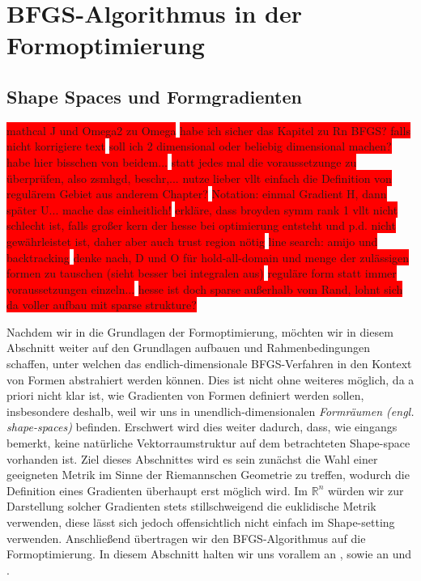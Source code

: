 
\section{BFGS-Algorithmus in der Formoptimierung}
\subsection{Shape Spaces und Formgradienten}
\label{Chap_shapespaces}

\colorbox{red}{mathcal J und Omega2 zu Omega} \newline
\colorbox{red}{habe ich sicher das Kapitel zu Rn BFGS? falls nicht korrigiere text}  \newline
\colorbox{red}{soll ich 2 dimensional oder beliebig dimensional machen? habe hier bisschen von beidem...} \newline
\colorbox{red}{ statt jedes mal die voraussetzunge zu überprüfen, also zsmhgd, beschr,... nutze lieber vllt einfach die Definition von regulärem Gebiet aus anderem Chapter?} \newline
\colorbox{red}{Notation: einmal Gradient H, dann später U... mache das einheitlich!} \newline
\colorbox{red}{erkläre, dass broyden symm rank 1 vllt nicht schlecht ist, falls großer kern der hesse bei optimierung entsteht und p.d. nicht gewährleistet ist,
daher aber auch trust region nötig} \newline
\colorbox{red}{line search: amijo und backtracking} \newline
\colorbox{red}{denke nach, D und O für hold-all-domain und menge der zulässigen formen zu tauschen (sieht besser bei integralen aus)} \newline
\colorbox{red}{reguläre form statt immer voraussetzungen einzeln...} \newline
\colorbox{red}{hesse ist doch sparse außerhalb vom Rand, lohnt sich da voller aufbau mit sparse strukture?}

Nachdem wir in die Grundlagen der Formoptimierung, möchten wir in diesem Abschnitt weiter auf den Grundlagen aufbauen und Rahmenbedingungen schaffen, unter welchen das endlich-dimensionale BFGS-Verfahren in den Kontext von Formen abstrahiert werden können. Dies ist nicht ohne weiteres möglich, da a priori nicht klar ist, wie Gradienten von Formen definiert werden sollen, insbesondere deshalb, weil wir uns in unendlich-dimensionalen \textit{Formräumen (engl. shape-spaces)} befinden. Erschwert wird dies weiter dadurch, dass, wie eingangs bemerkt, keine natürliche Vektorraumstruktur auf dem betrachteten Shape-space vorhanden ist. Ziel dieses Abschnittes wird es sein zunächst die Wahl einer geeigneten Metrik im Sinne der Riemannschen Geometrie zu treffen, wodurch die Definition eines Gradienten überhaupt erst möglich wird. Im $\mathbb{R}^n$ würden wir zur Darstellung solcher Gradienten stets stillschweigend die euklidische Metrik verwenden, diese lässt sich jedoch offensichtlich nicht einfach im Shape-setting verwenden. Anschließend übertragen wir den BFGS-Algorithmus auf die Formoptimierung. In diesem Abschnitt halten wir uns vorallem an \cite{bfgs2}, sowie an \cite{shape_space} und \cite{bfgs1}.

